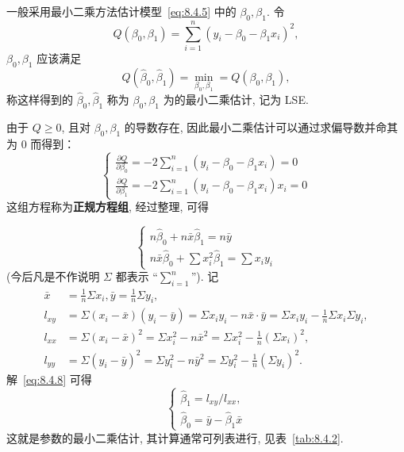 一般采用最小二乘方法估计模型~\ref{eq:8.4.5} 中的 $\beta_0, \beta_1$. 令
\begin{equation*}
  Q(\beta_{0}, \beta_{1}) = \sum_{i=1}^{n} (y_{i} - \beta_{0} - \beta_{1} x_{i})^{2}, 
\end{equation*} 
$\beta_0,\beta_1$ 应该满足
\begin{equation*}
  Q(\hat{\beta}_{0}, \hat{\beta}_{1}) =\min_{\beta_0, \beta_1} = Q(\beta_0, \beta_1),
\end{equation*}
称这样得到的 $\hat{\beta}_0, \hat{\beta}_1$ 称为 $\beta_0, \beta_1$ 为的最小二乘估计, 记为 LSE.

由于 $Q \ge 0$, 且对 $\beta_0, \beta_1$ 的导数存在, 因此最小二乘估计可以通过求偏导数并命其为 $0$ 而得到：
\begin{equation}\label{eq:8.4.7}
	\begin{cases}
	  \frac{\partial Q}{\partial \beta_{0}} = -2 \sum_{i=1}^{n}(y_{i} - \beta_{0} - \beta_{1} x_{i})=0 \\ 
		\frac{\partial Q}{\partial \beta_{1}} = -2 \sum_{i=1}^{n}(y_{i} - \beta_{0} - \beta_{1} x_{i}) x_{i}=0
	\end{cases}
\end{equation}
这组方程称为\textbf{正规方程组}, 经过整理, 可得

\begin{equation}\label{eq:8.4.8}
	\begin{cases}
		n \hat{\beta}_{0} + n \bar{x} \hat{\beta}_{1} = n \bar{y} \\ 
		n \bar{x} \hat{\beta}_{0} + \sum x_{i}^{2} \hat{\beta}_{1} = \sum x_{i} y_{i}
	\end{cases}
\end{equation}
(今后凡是不作说明 $\Sigma$ 都表示 “$\sum\limits_{i=1}^{n}$”). 记
\begin{equation*}
  \begin{split}
  \bar{x} & = \frac{1}{n} \Sigma x_{i}, \bar{y} = \frac{1}{n} \Sigma y_{i},\\
  l_{xy}  & = \Sigma(x_{i} - \bar{x}) (y_{i} - \bar{y}) = \Sigma x_{i} y_{i} - n \bar{x} \cdot \bar{y} = \Sigma x_{i} y_{i} - \frac{1}{n} \Sigma x_{i} \Sigma y_{i},\\
  l_{xx}  & = \Sigma(x_{i} - \bar{x})^{2} = \Sigma x_{i}^{2} - n \bar{x}^{2} = \Sigma x_{i}^{2} - \frac{1}{n}(\Sigma x_{i})^{2}, \\ 
  l_{y y} & = \Sigma(y_{i} - \bar{y})^{2} = \Sigma y_{i}^{2} - n \bar{y}^{2} = \Sigma y_{i}^{2} - \frac{1}{n}(\Sigma y_{i})^{2}.
  \end{split}
\end{equation*}
解~\ref{eq:8.4.8} 可得
\begin{equation}\label{eq:8.4.9}
  \begin{cases}
    \hat{\beta}_{1} = l_{xy}/l_{xx}, \\ 
    \hat{\beta}_{0} = \bar{y} - \hat{\beta}_{1} \bar{x}
  \end{cases}
\end{equation}
这就是参数的最小二乘估计, 其计算通常可列表进行, 见表~\ref{tab:8.4.2}.

